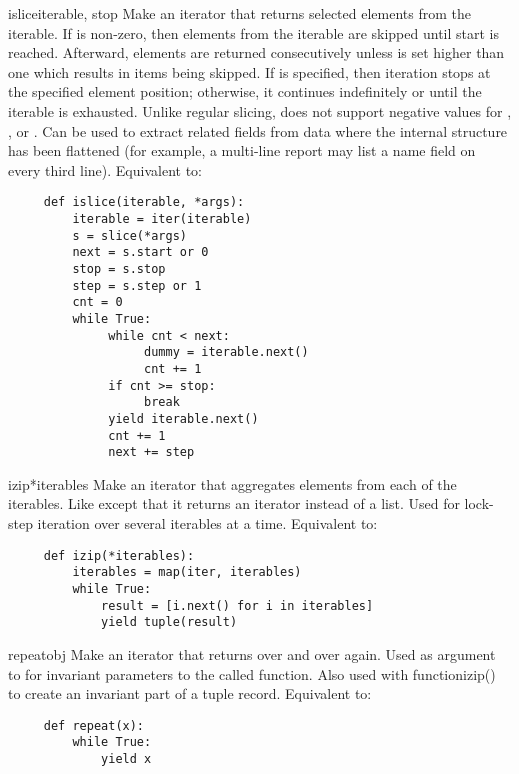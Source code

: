 \begin{funcdesc}{islice}{iterable,  stop }
  Make an iterator that returns selected elements from the iterable.
  If  is non-zero, then elements from the iterable are skipped
  until start is reached.  Afterward, elements are returned consecutively
  unless  is set higher than one which results in items being
  skipped.  If  is specified, then iteration stops at the
  specified element position; otherwise, it continues indefinitely or
  until the iterable is exhausted.  Unlike regular slicing,
   does not support negative values for ,
  , or .  Can be used to extract related fields
  from data where the internal structure has been flattened (for
  example, a multi-line report may list a name field on every
  third line).  Equivalent to:

  \begin{verbatim}
     def islice(iterable, *args):
         iterable = iter(iterable)
         s = slice(*args)
         next = s.start or 0
         stop = s.stop
         step = s.step or 1
         cnt = 0
         while True:
              while cnt < next:
                   dummy = iterable.next()
                   cnt += 1
              if cnt >= stop:
                   break
              yield iterable.next()
              cnt += 1
              next += step
  \end{verbatim}
\end{funcdesc}

\begin{funcdesc}{izip}{*iterables}
  Make an iterator that aggregates elements from each of the iterables.
  Like  except that it returns an iterator instead of
  a list.  Used for lock-step iteration over several iterables at a
  time.  Equivalent to:

  \begin{verbatim}
     def izip(*iterables):
         iterables = map(iter, iterables)
         while True:
             result = [i.next() for i in iterables]
             yield tuple(result)
  \end{verbatim}
\end{funcdesc}

\begin{funcdesc}{repeat}{obj}
  Make an iterator that returns  over and over again.
  Used as argument to  for invariant parameters
  to the called function.  Also used with function{izip()} to create
  an invariant part of a tuple record.  Equivalent to:

  \begin{verbatim}
     def repeat(x):
         while True:
             yield x
  \end{verbatim}
\end{funcdesc}

